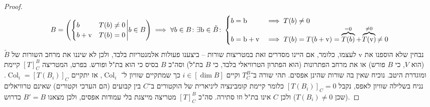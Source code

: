 \documentclass[]{article}
\newcommand\brm   {\mathrm{b}}
\newcommand\vrm   {\mathrm{v}}
\DeclareMathOperator\col   {Col}
\newcommand\co        {\colon}
\newcommand\tl    {\tilde}
\newcommand\cl [1]    {\left ( #1 \right )}
\begin{document}
\begin{enumerate}[A)]
\begin{proof}
			\[ B = \cl{\begin{cases}
					b & T(b) \neq 0\\
					b + \vrm & T(b) = 0
			\end{cases} \middle\vert b \in B } \implies \forall b \in B\co \exists \brm \in \tl B \co \begin{cases}
			 	b = \brm &\implies T(b) \neq 0 \\
			 	b = \brm + \vrm &\implies T(b) = T(b + \vrm) = \overbrace{T(b)}^{\mathclap{=0}} + \overbrace{\mathclap{T(\vrm)}}^{\neq 0} \neq 0
			\end{cases} \]
		נבחין שלא הוספנו את $\vrm$ לעצמו, כלומר, אם היינו מסדרים זאת במטריצות שורות – ביצענו פעולות אלמנטריות בלבד, ולכן לא שיננו את מרחב השורות של $\tl B$ (הוא $V$, כי $B$ פורש) או את מרחב הפתרונות (הוא הפתרון הטרוויאלי בלבד, כי $B$ בת"ל) וסה"כ $B$ בסיס כי הוא בת"ל ופורש. בפרט, המטריצה $[T]^{B}_C$ קיימת ומוגדרת היטב. נוכיח שאין בה שורות שהינן אפסים. תהי שורה ב־$T^B_C$ וקיים $i \in [\dim B]$ כך שמתקיים שוויון ל־ $\col_i$, אז יתקיים $\col_i = [T(B_i)]_C$. נניח בשלילה שוויון לאפס, נקבל $[T(B_i)]_C = 0$ כלומר קיימת קומבינציה ליניארית של הוקטורים ב־$C$ בין קבועים (הם הערכי וקטורים) שאינם טרוויאלים (שכן $T(B_i) \neq 0$) ולכן $C$ אינו בת"ל וזו סתירה. סה"כ $[T]^B_C$ מטריצה מייצגת בלי עמודות אפסים, ולכן מצאנו $B' = B$ כדרוש. 
		\end{proof}
	\end{enumerate}
	
\end{document}
